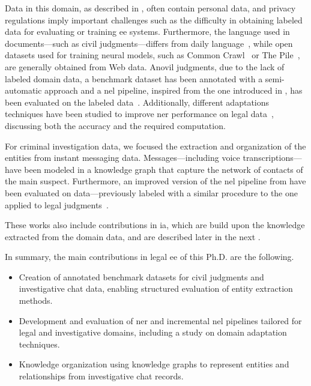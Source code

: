 Data in this domain, as described in , often contain personal data, and privacy regulations imply important challenges such as the difficulty in obtaining labeled data for evaluating or training \ac{ee} systems. Furthermore, the language used in documents---such as civil judgments---differs from daily language~\cite{ccetindaug2023name_legal_turkish}, while open datasets used for training neural models, such as Common Crawl~\cite{commoncrawl} or The Pile~\cite{gao2020pile800gbdatasetdiverse}, are generally obtained from Web data. Anovil judgments, due to the lack of labeled domain data, a benchmark dataset has been annotated with a semi-automatic approach and a \ac{nel} pipeline, inspired from the one introduced in , has been evaluated on the labeled data~\cite{BELLANDI2024}. Additionally, different adaptations techniques have been studied to improve \ac{ner} performance on legal data~\cite{aixia_2023}, discussing both the accuracy and the required computation.

For criminal investigation data, we focused the extraction and organization of the entities from instant messaging data. Messages---including voice transcriptions---have been modeled in a knowledge graph that capture the network of contacts of the main suspect. Furthermore, an improved version of the \ac{nel} pipeline from  have been evaluated on data---previously labeled with a similar procedure to the one applied to legal judgments~\cite{pozzi_wise_2025}.

These works also include contributions in \acl{ia}, which are build upon the knowledge extracted from the domain data, and are described later in the next .

In summary, the main contributions in legal \ac{ee} of this Ph.D. are the following.
\begin{itemize}
    \item Creation of annotated benchmark datasets for civil judgments and investigative chat data, enabling structured evaluation of entity extraction methods.
    \item Development and evaluation of \ac{ner} and incremental \ac{nel} pipelines tailored for legal and investigative domains, including a study on domain adaptation techniques.
    \item Knowledge organization using knowledge graphs to represent entities and relationships from investigative chat records.
\end{itemize}

